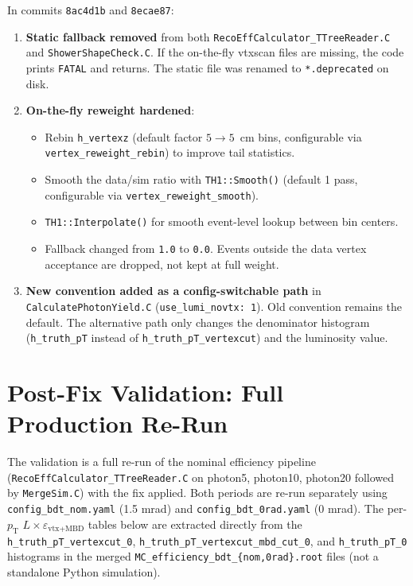 \documentclass[11pt,letterpaper]{article}
\newcommand{\pT}{\ensuremath{p_{\text{T}}}}
\newcommand{\veff}{\ensuremath{\varepsilon_{\text{vtx+MBD}}}}
\begin{document}
In commits \texttt{8ac4d1b} and \texttt{8ecae87}:

\begin{enumerate}
  \item \textbf{Static fallback removed} from both
    \texttt{RecoEffCalculator\_TTreeReader.C} and
    \texttt{ShowerShapeCheck.C}. If the on-the-fly vtxscan files
    are missing, the code prints \texttt{FATAL} and returns. The
    static file was renamed to \texttt{*.deprecated} on disk.
  \item \textbf{On-the-fly reweight hardened}:
  \begin{itemize}
    \item Rebin \texttt{h\_vertexz} (default factor
      $5 \rightarrow 5$~cm bins, configurable via
      \texttt{vertex\_reweight\_rebin}) to improve tail statistics.
    \item Smooth the data/sim ratio with \texttt{TH1::Smooth()}
      (default 1 pass, configurable via
      \texttt{vertex\_reweight\_smooth}).
    \item \texttt{TH1::Interpolate()} for smooth event-level lookup
      between bin centers.
    \item Fallback changed from \texttt{1.0} to \texttt{0.0}.
      Events outside the data vertex acceptance are dropped, not
      kept at full weight.
  \end{itemize}
  \item \textbf{New convention added as a config-switchable path}
    in \texttt{CalculatePhotonYield.C}
    (\texttt{use\_lumi\_novtx: 1}). Old convention remains the
    default. The alternative path only changes the denominator
    histogram (\texttt{h\_truth\_pT} instead of
    \texttt{h\_truth\_pT\_vertexcut}) and the luminosity value.
\end{enumerate}

\section{Post-Fix Validation: Full Production Re-Run}
\label{sec:validation}

The validation is a full re-run of the nominal efficiency pipeline
(\texttt{RecoEffCalculator\_TTreeReader.C} on photon5, photon10,
photon20 followed by \texttt{MergeSim.C}) with the fix applied.
Both periods are re-run separately using \texttt{config\_bdt\_nom.yaml}
(1.5 mrad) and \texttt{config\_bdt\_0rad.yaml} (0 mrad). The per-$\pT$
$L \times \veff$ tables below are extracted directly from the
\texttt{h\_truth\_pT\_vertexcut\_0},
\texttt{h\_truth\_pT\_vertexcut\_mbd\_cut\_0}, and
\texttt{h\_truth\_pT\_0} histograms in the merged
\texttt{MC\_efficiency\_bdt\_\{nom,0rad\}.root} files (not a standalone
Python simulation).
\end{document}
